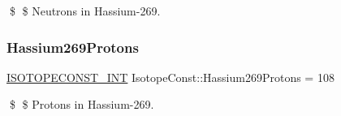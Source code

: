 \$ \$ Neutrons in Hassium-\/269. \mbox{\label{group___isotope_const-_hassium-_hs269_gadf0bbccbc6d07e5192ebd66795e74e20}} 
\subsubsection{\texorpdfstring{Hassium269\+Protons}{Hassium269Protons}}
{\footnotesize\ttfamily \mbox{\hyperlink{group___isotope_const-_macros_ga5f18360b3e99483a35c32d789e62621c}{I\+S\+O\+T\+O\+P\+E\+C\+O\+N\+S\+T\+\_\+\+I\+NT}} Isotope\+Const\+::\+Hassium269\+Protons = 108}

\$ \$ Protons in Hassium-\/269. 